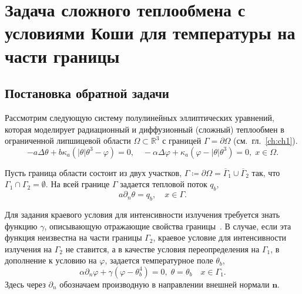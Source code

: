 \section{Задача сложного теплообмена с условиями Коши для температуры на части границы}
\label{sec:ch2/sec4}

\subsection{Постановка обратной задачи}\label{subsec:ch2/sec4/state}

Рассмотрим следующую систему полулинейных эллиптических уравнений, которая
моделирует радиационный и диффузионный (сложный) теплообмен в
ограниченной липшицевой области $\Omega\subset \mathbb{R}^3$ с границей
$\Gamma=\partial\Omega$ (см.\ гл.~\ref{ch:ch1}).
\begin{equation}
    \label{eq:2_4:eq1}
    - a\Delta\theta + b\kappa_a(|\theta|\theta^3- \varphi)=0,   \quad
    -\alpha \Delta \varphi + \kappa_a(\varphi-|\theta|\theta^3)=0,\; x\in\Omega.
\end{equation}

Пусть граница области состоит из двух участков,
$\Gamma \coloneqq \partial \Omega =\overline{\Gamma}_1 \cup \overline{\Gamma}_2$
так, что $\Gamma_1 \cap \Gamma_2 =  \emptyset$.
На всей границе $\Gamma$ задается тепловой поток $q_b$,
\begin{equation}
    \label{eq:2_4:bc1}
    a\partial_n\theta = q_b, \quad x\in \Gamma.
\end{equation}

Для задания краевого условия для интенсивности излучения
требуется знать функцию $\gamma$, описывающую отражающие свойства границы~\cite{JVM-14}.
В случае, если эта функция неизвестна на части границы $\Gamma_2$,
краевое условие для интенсивности излучения на $\Gamma_2$ не ставится, а в качестве условия
переопределения на $\Gamma_1$, в дополнение к условию на
$\varphi$, задается температурное поле $\theta_b$,
\begin{equation}
    \label{eq:2_4:bc2}
    \alpha\partial_n\varphi + \gamma (\varphi - \theta_b ^4 ) = 0,\;
    \theta=\theta_b\quad x\in \Gamma_1.
\end{equation}
Здесь через $\partial_n$ обозначаем производную в направлении
внешней нормали $\mathbf n$.

